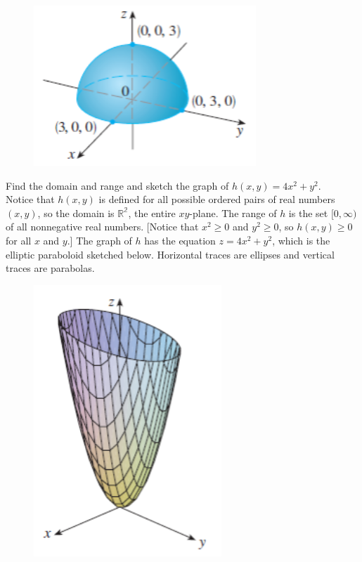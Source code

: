         \begin{figure}[hbt!]
            \centering
            \includegraphics[scale = 0.75]{Resources/14.1_Graph}
        \end{figure}

        \textit{} Find the domain and range and sketch the graph of $h(x,y) = 4x^2 + y^2$. \\

        Notice that $h(x,y)$ is defined for all possible ordered pairs of real numbers $(x,y)$, so the domain is $\mathbb{R^2}$, the entire $xy$-plane. The range of $h$ is the set $[0,\infty)$ of all nonnegative real
        numbers. [Notice that $x^2 \geq 0$ and $y^2 \geq 0$, so $h(x,y) \geq 0$ for all $x$ and $y$.] The graph of $h$ has the equation $z=4x^2 + y^2$, which is the elliptic paraboloid sketched below. Horizontal traces
        are ellipses and vertical traces are parabolas.

        \begin{figure}[hbt!]
            \centering
            \includegraphics[scale = 0.75]{Resources/14.1_Graph2}
        \end{figure}

